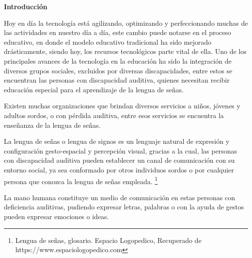 \documentclass[12pt]{report}%
\begin{document}
\thispagestyle{empty} %
\newpage%


\tableofcontents %
\thispagestyle{empty}
\newpage

\listoffigures
\thispagestyle{empty}
\newpage
\listoftables
\thispagestyle{empty}
\newpage

 \setlength{\parindent}{0.5cm}%
 \doublespacing%

\textbf{ Introducción}

Hoy en día la tecnología está agilizando, optimizando y perfeccionando muchas de las actividades en nuestro día a día, este cambio puede notarse en el proceso educativo, en donde el modelo educativo tradicional ha sido mejorado drásticamente, siendo hoy, los recursos tecnológicos parte vital de ella. Uno de los principales avances de la tecnología en la educación ha sido la integración de diversos grupos sociales, excluidos por diversas discapacidades, entre estos se encuentran las personas con discapacidad auditiva, quienes necesitan recibir educación especial para el aprendizaje de la lengua de señas.

Existen muchas organizaciones que brindan diversos servicios a niños, jóvenes y adultos sordos, o con pérdida auditiva, entre esos servicios se encuentra la enseñanza de la lengua de señas. 

La lengua de señas o lengua de signos es un lenguaje natural de expresión y configuración gesto-espacial y percepción visual, gracias a la cual, las personas con discapacidad auditiva pueden establecer un canal de comunicación con su entorno social, ya sea conformado por otros individuos sordos o por cualquier persona que conozca la lengua de señas empleada.  \footnote{ Lengua de señas, glosario. Espacio Logopedico, Recuperado de https://www.espaciologopedico.com}%

La mano humana constituye un medio de comunicación en estas personas con deficiencia auditivas, pudiendo expresar letras, palabras o con la ayuda de gestos pueden expresar emociones o ideas. 
\end{document}
